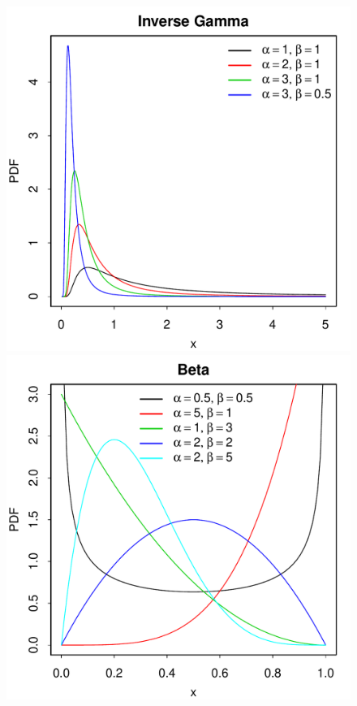 \documentclass[landscape]{article}
\begin{document}
\begin{figure}[H]
  \includegraphics[scale=0.35]{figs/invgamma.pdf}
  \includegraphics[scale=0.35]{figs/beta.pdf}

\end{figure}
\end{document}
